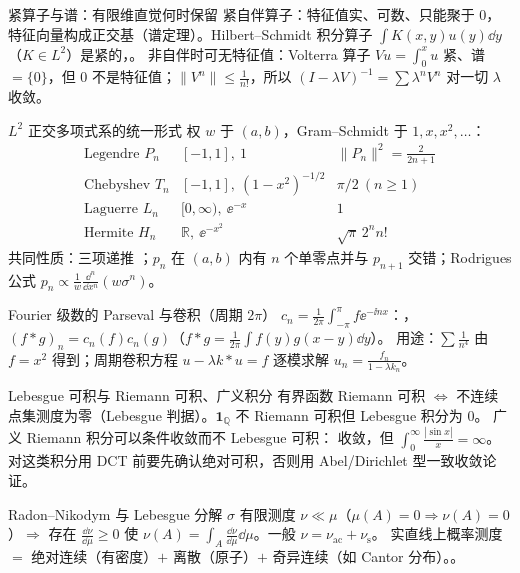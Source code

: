 \begin{结论}{紧算子与谱：有限维直觉何时保留}
紧自伴算子：特征值实、可数、只能聚于 $0$，特征向量构成正交基（谱定理）。Hilbert--Schmidt 积分算子 $\int K(x,y)u(y)\dd y$（$K\in L^2$）是紧的，。
非自伴时可无特征值：Volterra 算子 $Vu=\int_0^xu$ 紧、谱 $=\{0\}$，但 $0$ 不是特征值；$\|V^n\|\le\frac1{n!}$，所以 $(I-\lambda V)^{-1}=\sum\lambda^nV^n$ 对一切 $\lambda$ 收敛。
\end{结论}

\begin{结论}{$L^2$ 正交多项式系的统一形式}
权 $w$ 于 $(a,b)$，Gram--Schmidt 于 $1,x,x^2,\dots$：
\[
\begin{array}{lll}
\text{Legendre }P_n & [-1,1],\ 1 & \|P_n\|^2=\frac2{2n+1}\\
\text{Chebyshev }T_n & [-1,1],\ (1-x^2)^{-1/2} & \pi/2\ (n\ge1)\\
\text{Laguerre }L_n & [0,\infty),\ \ee^{-x} & 1\\
\text{Hermite }H_n & \mathbb R,\ \ee^{-x^2} & \sqrt\pi\,2^nn!
\end{array}
\]
共同性质：三项递推 ；$p_n$ 在 $(a,b)$ 内有 $n$ 个单零点并与 $p_{n+1}$ 交错；Rodrigues 公式 $p_n\propto\frac1w\frac{\dd^n}{\dd x^n}(w\sigma^n)$。
\end{结论}

\begin{结论}{Fourier 级数的 Parseval 与卷积（周期 $2\pi$）}
$c_n=\frac1{2\pi}\int_{-\pi}^\pi f\ee^{-\ii nx}$：，$(f*g)_n=c_n(f)c_n(g)$（$f*g=\frac1{2\pi}\int f(y)g(x-y)\dd y$）。
用途：$\sum\frac1{n^4}$ 由 $f=x^2$ 得到；周期卷积方程 $u-\lambda k*u=f$ 逐模求解 $u_n=\frac{f_n}{1-\lambda k_n}$。
\end{结论}

\begin{结论}{Lebesgue 可积与 Riemann 可积、广义积分}
有界函数 Riemann 可积 $\iff$ 不连续点集测度为零（Lebesgue 判据）。$\mathbf 1_{\mathbb Q}$ 不 Riemann 可积但 Lebesgue 积分为 $0$。
广义 Riemann 积分可以条件收敛而不 Lebesgue 可积： 收敛，但 $\int_0^\infty\frac{|\sin x|}{x}=\infty$。对这类积分用 DCT 前要先确认绝对可积，否则用 Abel/Dirichlet 型一致收敛论证。
\end{结论}

\begin{结论}{Radon--Nikodym 与 Lebesgue 分解}
$\sigma$ 有限测度 $\nu\ll\mu$（$\mu(A)=0\Rightarrow\nu(A)=0$）$\Rightarrow$ 存在 $\frac{\dd\nu}{\dd\mu}\ge0$ 使 $\nu(A)=\int_A\frac{\dd\nu}{\dd\mu}\dd\mu$。一般 $\nu=\nu_{\mathrm{ac}}+\nu_{\mathrm{s}}$。
实直线上概率测度 $=$ 绝对连续（有密度）$+$ 离散（原子）$+$ 奇异连续（如 Cantor 分布）。。
\end{结论}

